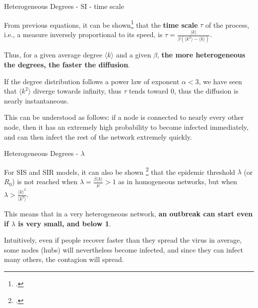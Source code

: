 \documentclass[a4paper,11pt]{book}
\begin{document}
\begin{textbox}{Heterogeneous Degrees - SI - time scale}

From previous equations, it can be shown\footcite{barrat2008dynamical} that the \textbf{time scale} $\tau$ of the process, i.e., a measure inversely proportional to its speed, is $\tau=\frac{\langle k \rangle}{\beta(\langle k^2 \rangle - \langle k \rangle)}$. 

Thus, for a given average degree $\langle k \rangle$ and a given $\beta$, \textbf{the more heterogeneous the degrees, the faster the diffusion}.

If the degree distribution follows a power law of exponent $\alpha<3$, we have seen that $\langle k^2 \rangle$ diverge towards infinity, thus $\tau$ tends toward 0, thus the diffusion is nearly instantaneous.

This can be understood as follows: if a node is connected to nearly every other node, then it has an extremely high probability to become infected immediately, and can then infect the rest of the network extremely quickly.

\end{textbox}



\begin{textbox}{Heterogeneous Degrees - $\lambda$}

For SIS and SIR models, it can also be shown \footcite{barrat2008dynamical} that the epidemic threshold $\lambda$ (or $R_0$) is not reached when $\lambda=\frac{\beta\langle k \rangle}{\mu}>1$ as in homogeneous networks, but when $\lambda >\frac{\langle k \rangle^2}{\langle k^2 \rangle}$.

This means that in a very heterogeneous network, \textbf{an outbreak can start even if $\lambda$ is very small, and below 1}. 

Intuitively, even if people recover faster than they spread the virus in average, some nodes (hubs) will nevertheless become infected, and since they can infect many others, the contagion will spread.


\end{textbox}



\end{document}
